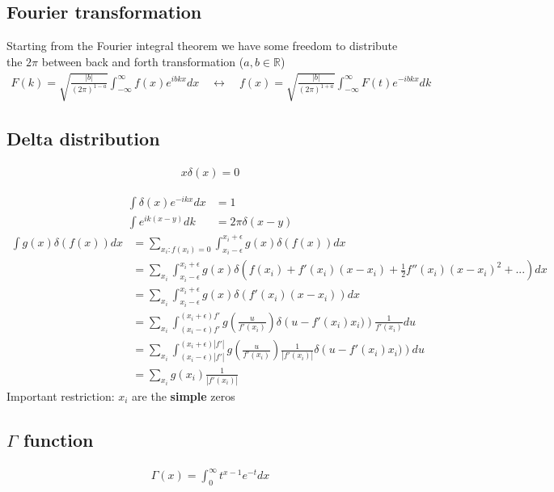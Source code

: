 \documentclass[10pt,a4paper]{article}
\theoremstyle{definition}
\begin{document}
\subsection{Fourier transformation}
Starting from the Fourier integral theorem we have some freedom to distribute the $2\pi$ between back and forth transformation ($a,b\in\mathbb{R}$)
\begin{align}
    F(k)=\sqrt{\frac{|b|}{(2\pi)^{1-a}}}\int_{-\infty}^\infty f(x)e^{ibkx}dx\quad\leftrightarrow\quad f(x)=\sqrt{\frac{|b|}{(2\pi)^{1+a}}}\int_{-\infty}^\infty F(t)e^{-ibkx}dk
\end{align}

\subsection{Delta distribution}
\begin{align}
x\delta(x)=0
\end{align}

\begin{align}
    \int\delta(x)e^{-ikx}dx&=1\\
    \int e^{ik(x-y)}dk&=2\pi\delta(x-y)
\end{align}
\begin{align}
    \int g(x)\delta(f(x))dx &= \sum_{x_i:f(x_i)=0}\int_{x_i-\epsilon}^{x_i+\epsilon} g(x)\delta(f(x))dx\\
    &= \sum_{x_i}\int_{x_i-\epsilon}^{x_i+\epsilon} g(x)\delta\left(f(x_i)+f'(x_i)(x-x_i)+\frac{1}{2}f''(x_i)(x-x_i)^2+...\right)dx\\
    &= \sum_{x_i}\int_{x_i-\epsilon}^{x_i+\epsilon} g(x)\delta\left(f'(x_i)(x-x_i)\right)dx\\
    &= \sum_{x_i}\int_{(x_i-\epsilon)f'}^{(x_i+\epsilon)f'} g\left(\frac{u}{f'(x_i)}\right)\delta\left(u-f'(x_i)x_i)\right)\frac{1}{f'(x_i)}du\\
    &= \sum_{x_i}\int_{(x_i-\epsilon)|f'|}^{(x_i+\epsilon)|f'|} g\left(\frac{u}{f'(x_i)}\right)\frac{1}{|f'(x_i)|}\delta\left(u-f'(x_i)x_i)\right)du\\
    &= \sum_{x_i} g(x_i)\frac{1}{|f'(x_i)|}
\end{align}
Important restriction: $x_i$ are the {\bf simple} zeros

\subsection{\texorpdfstring{$\Gamma$}{TEXT} function}
\begin{align}
    \Gamma(x)=\int_0^\infty t^{x-1}e^{-t} dx
\end{align}
\end{document}

